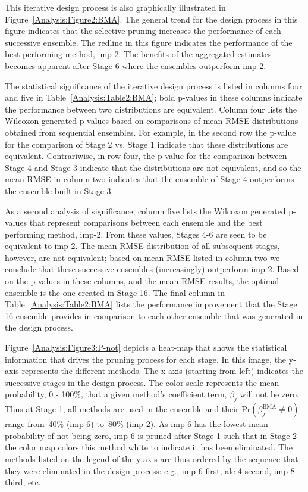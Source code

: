 \documentclass[12pt]{article}
\newcommand{\+}[1]{\ensuremath{\mathbf{#1}}}
\begin{document}
This iterative design process is also graphically illustrated in Figure~\ref{Analysis:Figure2:BMA}. The general trend for the design process in this figure indicates that the selective pruning increases the performance of each successive ensemble.  The redline in this figure indicates the performance of the best performing method, imp-2. The benefits of the aggregated estimates becomes apparent after Stage 6 where the ensembles outperform imp-2.

The statistical significance of the iterative design process is listed in columns four and five in Table~\ref{Analysis:Table2:BMA}; bold p-values in these columns indicate the performance between two distributions are equivalent.  Column four lists the Wilcoxon generated p-values based on comparisons of mean RMSE distributions obtained from sequential ensembles. For example, in the second row the p-value for the comparison of Stage 2 vs. Stage 1 indicate that these distributions are equivalent. Contrariwise, in row four, the p-value for the comparison between Stage 4 and Stage 3 indicate that the distributions are not equivalent, and so the mean RMSE in column two indicates that the ensemble of Stage 4 outperforms the ensemble built in Stage 3.

As a second analysis of significance, column five lists the Wilcoxon generated p-values that represent comparisons between each ensemble and the best performing method, imp-2. From these values, Stages 4-6 are seen to be equivalent to imp-2. The mean RMSE distribution of all subsequent stages, however, are not equivalent; based on mean RMSE listed in column two we conclude that these successive ensembles (increasingly) outperform imp-2.  Based on the p-values in these columns, and the mean RMSE results, the optimal ensemble is the one created in Stage 16.  The final column in Table~\ref{Analysis:Table2:BMA} lists the performance improvement that the Stage 16 ensemble provides in comparison to each other ensemble that was generated in the design process.

Figure~\ref{Analysis:Figure3:P-not} depicts a heat-map that shows the statistical information that drives the pruning process for each stage. In this image, the y-axis represents the different methods. The x-axis (starting from left) indicates the successive stages in the design process. The color scale represents the mean probability, 0 - 100\%, that a given method's coefficient term, $\beta_j$ will not be zero. Thus at Stage 1, all methods are used in the ensemble and their $\mathrm{Pr}(\beta_j^{\text{BMA}}\neq 0)$ range from~40\% (imp-6) to~80\% (imp-2). As imp-6 has the lowest mean probability of not being zero, imp-6 is pruned after Stage 1 such that in Stage 2 the color map colors this method white to indicate it has been eliminated.  The methods listed on the legend of the y-axis are thus ordered by the sequence that they were eliminated in the design process: e.g., imp-6 first, alc-4 second, imp-8 third, etc.
\end{document}
